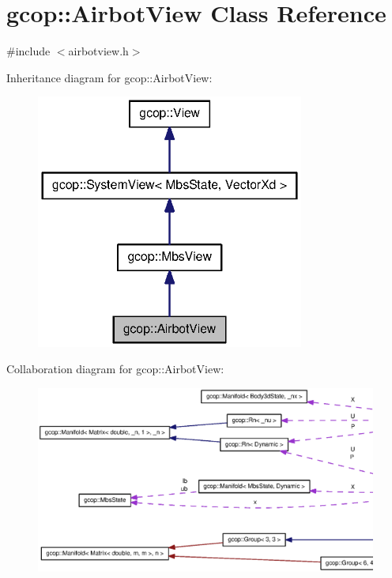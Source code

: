 \section{gcop\-:\-:\-Airbot\-View \-Class \-Reference}
\label{classgcop_1_1AirbotView}


{\ttfamily \#include $<$airbotview.\-h$>$}



\-Inheritance diagram for gcop\-:\-:\-Airbot\-View\-:\nopagebreak
\begin{figure}[H]
\begin{center}
\leavevmode
\includegraphics[width=250pt]{classgcop_1_1AirbotView__inherit__graph}
\end{center}
\end{figure}


\-Collaboration diagram for gcop\-:\-:\-Airbot\-View\-:\nopagebreak
\begin{figure}[H]
\begin{center}
\leavevmode
\includegraphics[width=350pt]{classgcop_1_1AirbotView__coll__graph}
\end{center}
\end{figure}

